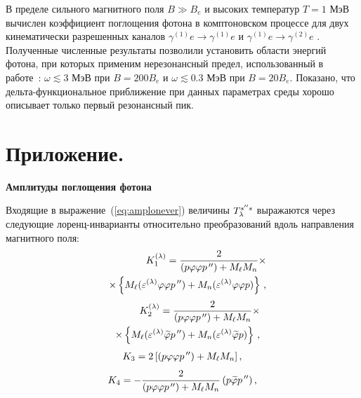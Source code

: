 \documentclass[cp1251%
               ]{jetp} %
\begin{document}
В пределе сильного магнитного поля $B\gg B_e$ и высоких температур $T=1$ МэВ вычислен коэффициент поглощения фотона в комптоновском процессе для двух кинематически разрешенных каналов $\gamma^{(1)} e\to \gamma^{(1)} e$ и $\gamma^{(1)} e\to \gamma^{(2)} e$ . Полученные численные результаты позволили установить области энергий фотона, при которых применим нерезонансный предел, использованный в работе~\cite{Chistyakov:2009}: $\omega\lesssim 3$ МэВ при $B=200B_e$ и $\omega\lesssim 0.3$ МэВ при $B=20B_e$. Показано, что дельта-функциональное приближение при данных параметрах среды хорошо описывает только первый резонансный пик.



\section*{Приложение.}

\begin{center}
\textbf{Амплитуды поглощения фотона}
\end{center}


Входящие в выражение~(\ref{eq:amplonever}) величины ${\cal T}^{s'' s}_\lambda$ выражаются через следующие 
лоренц-инварианты относительно преобразований вдоль направления магнитного поля:
%
\begin{eqnarray}
\label{eq:K1}
&&{\cal K}_{1}^{(\lambda)} = \sqrt{\frac{2}{(p\tilde \varphi\tilde \varphi p^{\, \prime \prime}) + 
M_\ell M_{n}}} \times 
\\
\nonumber 
&&\times \left \{M_\ell (\varepsilon^{(\lambda)}\tilde \varphi\tilde \varphi p^{\, \prime \prime}) + 
M_{n} (\varepsilon^{(\lambda)}\tilde \varphi\tilde \varphi p)  \right \}\, ,
\end{eqnarray}
%
\begin{eqnarray}
&&{\cal K}_{2}^{(\lambda)} = \sqrt{\frac{2}{(p\tilde \varphi\tilde \varphi p^{\, \prime \prime}) + 
M_\ell M_{n}}} 
\times
\\
\nonumber
&&\times
 \left \{M_\ell (\varepsilon^{(\lambda)}\widetilde \varphi p^{\, \prime \prime}) + 
M_{n} (\varepsilon^{(\lambda)}\widetilde \varphi p)  \right \}\, ,
\label{eq:K2}
\end{eqnarray}
%
\begin{eqnarray}
{\cal K}_{3} = \sqrt{2\left [(p\tilde \varphi\tilde \varphi p^{\, \prime \prime}) + 
M_\ell M_{n} \right]} \, ,  
\end{eqnarray}
%
\begin{eqnarray}
{\cal K}_4 = 
- \sqrt{\frac{2}{(p\tilde \varphi\tilde \varphi p^{\, \prime \prime}) + M_\ell M_{n}}}\, 
(p\widetilde \varphi p^{\, \prime \prime}) \, ,
\label{eq:K34}
\end{eqnarray}
%
\end{document}
